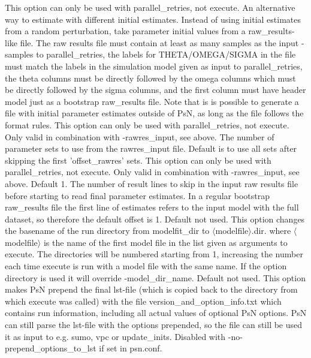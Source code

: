 \begin{optionlist}
This option can only be used with parallel\_retries, not execute. An alternative way to estimate with different initial estimates. 
Instead of using initial estimates from a random perturbation, take parameter initial values from a raw\_results-like file.
The raw results file must contain at least as many samples as the input -samples to parallel\_retries, the labels for  THETA/OMEGA/SIGMA 
in the file must match the labels in the simulation model given as input to parallel\_retries, 
the theta columns must be directly followed by the omega columns which must be directly followed by the sigma columns, and the first column 
must have header model just as a bootstrap raw\_results file. Note that is is possible to generate a file with initial parameter estimates outside of PsN, 
as long as the file follows the format rules.
\nextopt
{}
This option can only be used with parallel\_retries, not execute. Only valid in combination with -rawres\_input, see above. The number of
parameter sets to use from the rawres\_input file. Default is to use all sets after skipping the first 'offset\_rawres' sets.
\nextopt
{}
This option can only be used with parallel\_retries, not execute. Only valid in combination with -rawres\_input, see above. Default 1.
The number of result lines to skip in the input raw results file before starting to read final parameter estimates. In a regular
bootstrap raw\_results file the first line of estimates refers to the input model with the full dataset, so therefore the default offset is 1.
\nextopt
{}
Default not used. This option changes the basename of the run directory from modelfit\_dir to $\langle$modelfile$\rangle$.dir. where $\langle$modelfile$\rangle$ is the name of the first model file in the list given as arguments to execute. The directories will be numbered starting from 1, increasing the number each time execute is run with a model file with the same name. If the option directory is used it will override -model\_dir\_name.
\nextopt
{}
Default not used. This option makes PsN prepend the final lst-file (which is copied back to the directory from which execute was called) with the file version\_and\_option\_info.txt which contains run information, including     all actual values of optional PsN options. PsN can still parse the lst-file with the options prepended, so the file can still be used it as input to e.g. sumo, vpc or update\_inits. Disabled with -no-prepend\_options\_to\_lst if set in psn.conf.

\end{optionlist}
